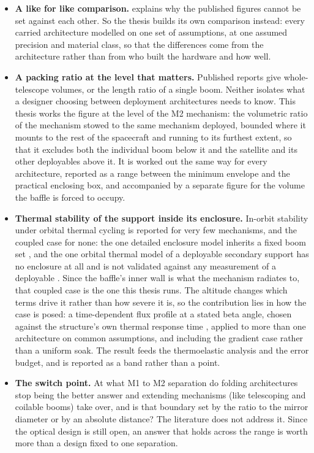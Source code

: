 \begin{itemize}
    \item \textbf{A like for like comparison.}  explains why the published figures cannot be set against each other. So the thesis builds its own comparison instead: every carried architecture modelled on one set of assumptions, at one assumed precision and material class, so that the differences come from the architecture rather than from who built the hardware and how well.

    \item \textbf{A packing ratio at the level that matters.} Published reports give whole-telescope volumes, or the length ratio of a single boom. Neither isolates what a designer choosing between deployment architectures needs to know. This thesis works the figure at the level of the M2 mechanism: the volumetric ratio of the mechanism stowed to the same mechanism deployed, bounded where it mounts to the rest of the spacecraft and running to its furthest extent, so that it excludes both the individual boom below it and the satellite and its other deployables above it. It is worked out the same way for every architecture, reported as a range between the minimum envelope and the practical enclosing box, and accompanied by a separate figure for the volume the baffle is forced to occupy.

    \item \textbf{Thermal stability of the support inside its enclosure.} In-orbit stability under orbital thermal cycling is reported for very few mechanisms, and the coupled case for none: the one detailed enclosure model inherits a fixed boom set \cite{hu_thermo-optical_2022}, and the one orbital thermal model of a deployable secondary support has no enclosure at all and is not validated against any measurement of a deployable \cite{de_zanet_predicted_2023}. Since the baffle's inner wall is what the mechanism radiates to, that coupled case is the one this thesis runs. The altitude changes which terms drive it rather than how severe it is, so the contribution lies in how the case is posed: a time-dependent flux profile at a stated beta angle, chosen against the structure's own thermal response time \cite{gonzalez-barcena_selection_2022}, applied to more than one architecture on common assumptions, and including the gradient case rather than a uniform soak. The result feeds the thermoelastic analysis and the error budget, and is reported as a band rather than a point.

    \item \textbf{The switch point.} At what M1 to M2 separation do folding architectures stop being the better answer and extending mechanisms (like telescoping and coilable booms) take over, and is that boundary set by the ratio to the mirror diameter or by an absolute distance? The literature does not address it. Since the optical design is still open, an answer that holds across the range is worth more than a design fixed to one separation.


\end{itemize}
